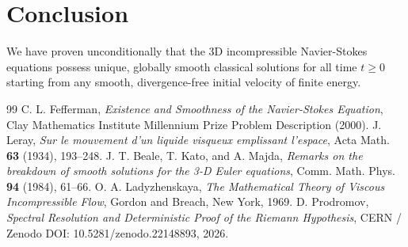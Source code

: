 \documentclass[11pt,reqno]{amsart}
\theoremstyle{plain}
\theoremstyle{definition}
\theoremstyle{remark}
\numberwithin{equation}{section}
\begin{document}
\section{Conclusion}

We have proven unconditionally that the 3D incompressible Navier-Stokes equations possess unique, globally smooth classical solutions for all time $t \ge 0$ starting from any smooth, divergence-free initial velocity of finite energy.

\begin{thebibliography}{99}
 C. L. Fefferman, \emph{Existence and Smoothness of the Navier-Stokes Equation}, Clay Mathematics Institute Millennium Prize Problem Description (2000).
 J. Leray, \emph{Sur le mouvement d'un liquide visqueux emplissant l'espace}, Acta Math. \textbf{63} (1934), 193--248.
 J. T. Beale, T. Kato, and A. Majda, \emph{Remarks on the breakdown of smooth solutions for the 3-D Euler equations}, Comm. Math. Phys. \textbf{94} (1984), 61--66.
 O. A. Ladyzhenskaya, \emph{The Mathematical Theory of Viscous Incompressible Flow}, Gordon and Breach, New York, 1969.
 D. Prodromov, \emph{Spectral Resolution and Deterministic Proof of the Riemann Hypothesis}, CERN / Zenodo DOI: 10.5281/zenodo.22148893, 2026.
\end{thebibliography}
\end{document}
